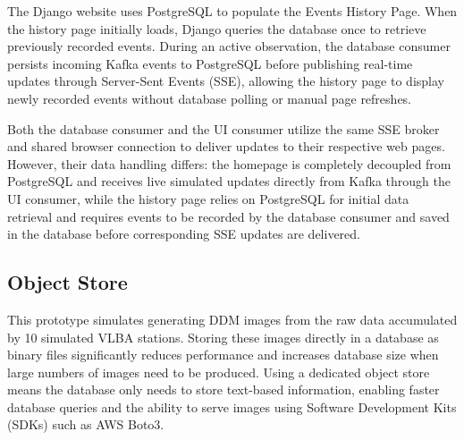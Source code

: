 \documentclass[12pt]{article}
\begin{document}
The Django website uses PostgreSQL to populate the Events History Page. When the history page initially loads, Django queries the database once to retrieve previously recorded events. During an active observation, the database consumer persists incoming Kafka events to PostgreSQL before publishing real-time updates through Server-Sent Events (SSE), allowing the history page to display newly recorded events without database polling or manual page refreshes.

Both the database consumer and the UI consumer utilize the same SSE broker and shared browser connection to deliver updates to their respective web pages. However, their data handling differs: the homepage is completely decoupled from PostgreSQL and receives live simulated updates directly from Kafka through the UI consumer, while the history page relies on PostgreSQL for initial data retrieval and requires events to be recorded by the database consumer and saved in the database before corresponding SSE updates are delivered.

\subsection*{Object Store}

  This prototype simulates generating DDM images from the raw data accumulated by 10 simulated VLBA stations. Storing these images directly in a database as binary files significantly reduces performance and increases database size when large numbers of images need to be produced. Using a dedicated object store means the database only needs to store text-based information, enabling faster database queries and the ability to serve images using Software Development Kits (SDKs) such as AWS Boto3. 
\end{document}
